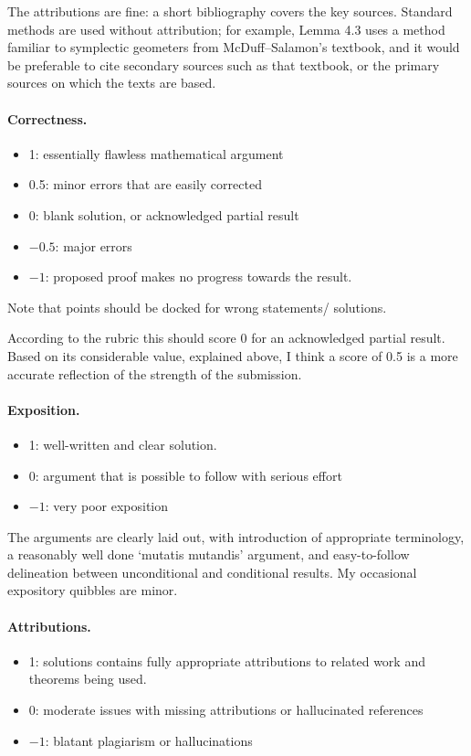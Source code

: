 \documentclass[11pt]{article}
\theoremstyle{definition}
\theoremstyle{remark}
\begin{document}
The attributions are fine: a short bibliography covers the key sources. Standard methods are used without attribution; for example, Lemma 4.3 uses a method familiar to symplectic geometers from McDuff--Salamon's textbook, and it would be preferable to cite secondary sources such as that textbook, or the primary sources on which the texts are based. 


\paragraph{Correctness.}
\begin{itemize}
	\item  1: essentially flawless mathematical argument
	\item  0.5: minor errors that are easily corrected
	\item  0: blank solution, or acknowledged partial result
	\item  $-0.5$: major errors
	\item  $-1$: proposed proof makes no progress towards the result.
\end{itemize}
Note that points should be docked for wrong statements/ solutions.

\vspace{5mm}

 According to the rubric this should score 0 for an acknowledged partial result. Based on its considerable value, explained above, I think a score of 0.5 is a more accurate reflection of the strength of the submission. 

\paragraph{Exposition.}
\begin{itemize}
	\item  1: well-written and clear solution.
	\item  0: argument that is possible to follow with serious effort
	\item  $-1$: very poor exposition
\end{itemize}

 The arguments are clearly laid out, with introduction of appropriate terminology, a reasonably well done `mutatis mutandis' argument, and easy-to-follow delineation between unconditional and conditional results.  My occasional expository quibbles are minor.


\paragraph{Attributions.}
\begin{itemize}
	\item  1: solutions contains fully appropriate attributions
		to related work and theorems being used.
	\item  0: moderate issues with missing attributions or hallucinated references
	\item  $-1$: blatant plagiarism or hallucinations
\end{itemize}
\end{document}
